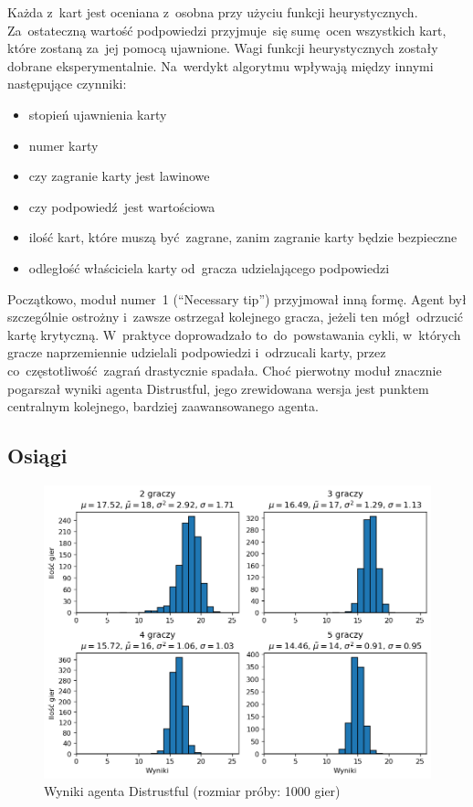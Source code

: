 \documentclass[declaration,shortabstract,inz]{iithesis}
\begin{document}
Każda z~kart jest oceniana z~osobna przy użyciu funkcji heurystycznych. Za~ostateczną wartość podpowiedzi przyjmuje~się sumę ocen wszystkich kart, które zostaną za~jej pomocą ujawnione. Wagi funkcji heurystycznych zostały dobrane eksperymentalnie. Na~werdykt algorytmu wpływają między innymi następujące czynniki:
\begin{itemize}
	\item stopień ujawnienia karty
	\item numer karty
	\item czy zagranie karty jest lawinowe
	\item czy podpowiedź jest wartościowa
	\item ilość kart, które muszą być zagrane, zanim zagranie karty będzie bezpieczne
	\item odległość właściciela karty od~gracza udzielającego podpowiedzi
\end{itemize}

Początkowo, moduł numer~1 (``Necessary tip'') przyjmował inną formę. Agent był szczególnie ostrożny i~zawsze ostrzegał kolejnego gracza, jeżeli ten mógł odrzucić kartę krytyczną. W~praktyce doprowadzało to~do~powstawania cykli, w~których gracze naprzemiennie udzielali podpowiedzi i~odrzucali karty, przez co~częstotliwość zagrań drastycznie spadała. Choć pierwotny moduł znacznie pogarszał wyniki agenta Distrustful, jego zrewidowana wersja jest punktem centralnym kolejnego, bardziej zaawansowanego agenta.

\subsection*{Osiągi}

\begin{figure}[H]
	\centering
	\captionsetup{format=hang}
	\includegraphics[width=\textwidth,height=\textheight,keepaspectratio]{Distrustful.png}
	\caption[Caption]{Wyniki agenta Distrustful (rozmiar próby: 1000 gier)}
	\label{fig:Distrustful}
\end{figure}
\end{document}
